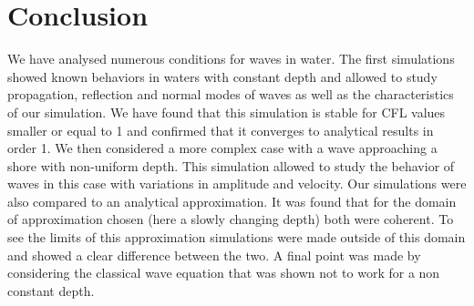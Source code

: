 \section{Conclusion}
We have analysed numerous conditions for waves in water. The first simulations showed known behaviors in waters with constant depth and allowed to study propagation, reflection and normal modes of waves as well as the characteristics of our simulation. We have found that this simulation is stable for CFL values smaller or equal to 1 and confirmed that it converges to analytical results in order 1. We then considered a more complex case with a wave approaching a shore with non-uniform depth. This simulation allowed to study the behavior of waves in this case with variations in amplitude and velocity. Our simulations were also compared to an analytical approximation. It was found that for the domain of approximation chosen (here a slowly changing depth) both were coherent. To see the limits of this approximation simulations were made outside of this domain and showed a clear difference between the two. A final point was made by considering the classical wave equation that was shown not to work for a non constant depth.

